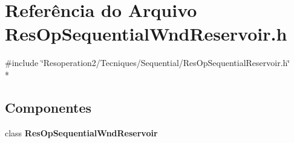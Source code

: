 \section{Referência do Arquivo Res\+Op\+Sequential\+Wnd\+Reservoir.\+h}
\label{_res_op_sequential_wnd_reservoir_8h}
{\ttfamily \#include \char`\"{}Resoperation2/\+Tecniques/\+Sequential/\+Res\+Op\+Sequential\+Reservoir.\+h\char`\"{}}\\*
\subsection*{Componentes}
\begin{DoxyCompactItemize}
\item 
class {\bf Res\+Op\+Sequential\+Wnd\+Reservoir}
\end{DoxyCompactItemize}
